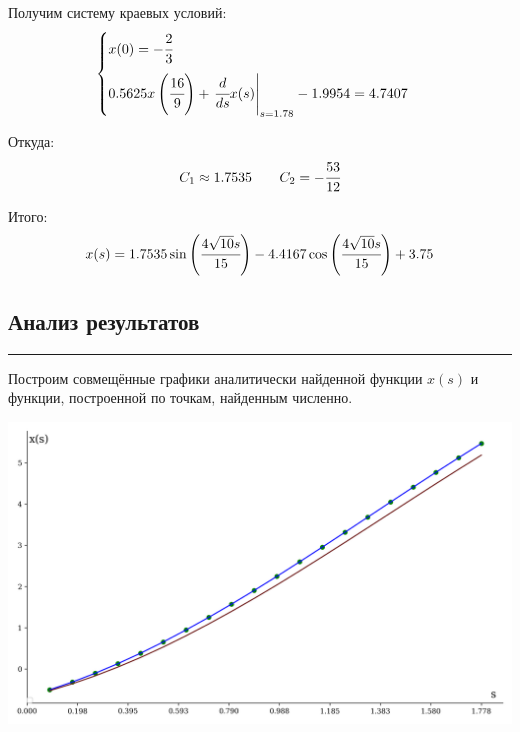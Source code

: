 \documentclass[a4paper, 14pt]{extarticle}
\begin{document}
Получим систему краевых условий:
\begin{equation*}
    \begin{cases}
    x(0) = - \cfrac{2}{3} \\[1em]
    0.5625 x\left(\cfrac{16}{9}\right) + \left. \cfrac{d}{d s} x(s) \right|_{\substack{ s=1.78 }} - 1.9954 = 4.7407
    \end{cases}
\end{equation*}
    
Откуда:
\begin{equation*}
    C_1 \approx 1.7535 \qquad C_2 = - \cfrac{53}{12}
\end{equation*}

Итого:
\begin{equation*}
    x(s) = 1.7535 \sin\left(\cfrac{4 \sqrt{10} s}{15}\right) - 4.4167 \cos\left(\cfrac{4 \sqrt{10} s}{15}\right) + 3.75
\end{equation*}

\vspace{10pt}

\subsection*{Анализ результатов}\vspace{-20pt}\rule{\linewidth}{0.1mm}

Построим совмещённые графики аналитически найденной функции $x(s)$ и 
функции, построенной по точкам, найденным численно.

\vfill

\begin{center}
    \includegraphics[width=1\textwidth]{plot}
\end{center}

\vfill
\end{document}
